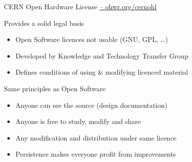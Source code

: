\documentclass[compress,red]{beamer}
\begin{document}
\begin{frame}{CERN Open Hardware License \href{http://ohwr.org/cernohl}{-- ohwr.org/cernohl}}
    
    \begin{block}{Provides a solid legal basis}
      \begin{itemize}
        \item Open Software licences not usable (GNU, GPL, \dots)
        \item Developed by Knowledge and Technology Transfer Group
        \item Defines conditions of using \& modifying licenced material
      \end{itemize}
   \end{block}

   \begin{block}{Same principles as Open Software}
      \begin{itemize}
        \item Anyone can see the source (design documentation)
        \item Anyone is free to study, modify and share
        \item Any modification and distribution under same licence
        \item Persistence makes everyone profit from improvements
      \end{itemize}
   \end{block}

\end{frame}
\end{document}
